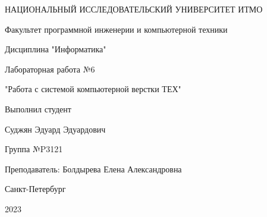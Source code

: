 \thispagestyle{empty} 
\begin{center}
    \Large
    НАЦИОНАЛЬНЫЙ ИССЛЕДОВАТЕЛЬСКИЙ УНИВЕРСИТЕТ ИТМО

    Факультет программной инженерии и компьютерной техники 

    \vspace{150pt}

    Дисциплина "Информатика" 

    Лабораторная работа №6

    "Работа с системой компьютерной верстки ТЕХ"

    \vspace{85pt}
\end{center}

\large
\hspace*{\fill} Выполнил студент

\hspace*{\fill} Суджян Эдуард Эдуардович

\hspace*{\fill} Группа №P3121

\hspace*{\fill} Преподаватель: Болдырева Елена Александровна

\vspace{100pt}

\large
\begin{center}
    Санкт-Петербург

    2023
\end{center}